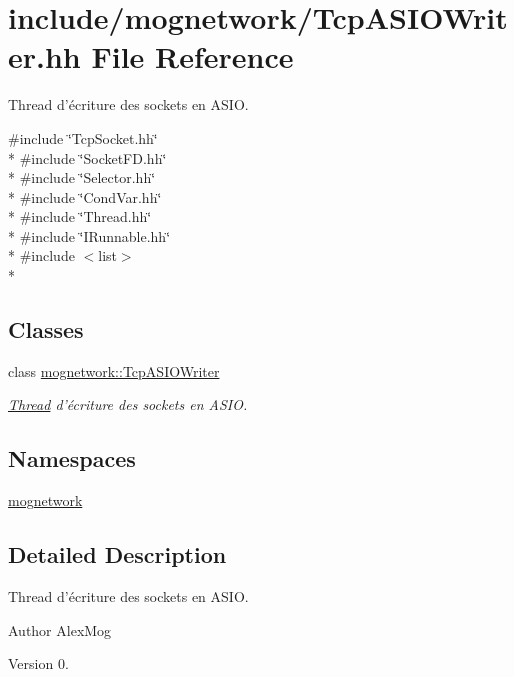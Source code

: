 \hypertarget{_tcp_a_s_i_o_writer_8hh}{\section{include/mognetwork/\-Tcp\-A\-S\-I\-O\-Writer.hh File Reference}
\label{_tcp_a_s_i_o_writer_8hh}
}


Thread d'écriture des sockets en A\-S\-I\-O.  


{\ttfamily \#include \char`\"{}Tcp\-Socket.\-hh\char`\"{}}\\*
{\ttfamily \#include \char`\"{}Socket\-F\-D.\-hh\char`\"{}}\\*
{\ttfamily \#include \char`\"{}Selector.\-hh\char`\"{}}\\*
{\ttfamily \#include \char`\"{}Cond\-Var.\-hh\char`\"{}}\\*
{\ttfamily \#include \char`\"{}Thread.\-hh\char`\"{}}\\*
{\ttfamily \#include \char`\"{}I\-Runnable.\-hh\char`\"{}}\\*
{\ttfamily \#include $<$list$>$}\\*
\subsection*{Classes}
\begin{DoxyCompactItemize}
\item 
class \hyperlink{classmognetwork_1_1_tcp_a_s_i_o_writer}{mognetwork\-::\-Tcp\-A\-S\-I\-O\-Writer}
\begin{DoxyCompactList}\small\item\em \hyperlink{classmognetwork_1_1_thread}{Thread} d'écriture des sockets en A\-S\-I\-O. \end{DoxyCompactList}\end{DoxyCompactItemize}
\subsection*{Namespaces}
\begin{DoxyCompactItemize}
\item 
\hyperlink{namespacemognetwork}{mognetwork}
\end{DoxyCompactItemize}


\subsection{Detailed Description}
Thread d'écriture des sockets en A\-S\-I\-O. \begin{DoxyAuthor}{Author}
Alex\-Mog 
\end{DoxyAuthor}
\begin{DoxyVersion}{Version}
0. 
\end{DoxyVersion}
